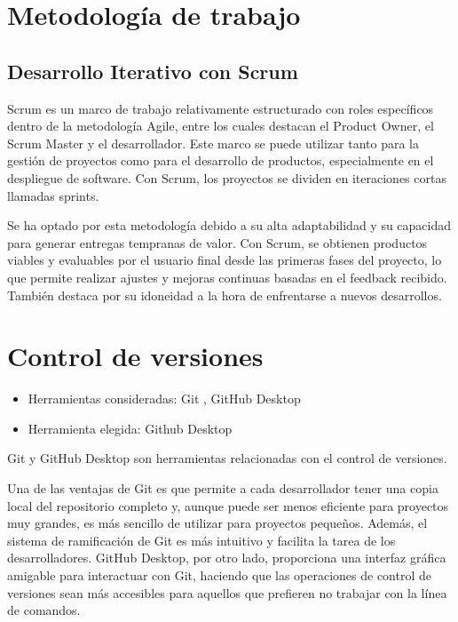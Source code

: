 
\section{Metodología de trabajo}\label{metodologias}

\subsection{Desarrollo Iterativo con Scrum}\label{scrum}
Scrum es un marco de trabajo relativamente estructurado con roles específicos dentro de la metodología Agile, entre los cuales destacan el Product Owner, el Scrum Master y el desarrollador. Este marco se puede utilizar tanto para la gestión de proyectos como para el desarrollo de productos, especialmente en el despliegue de software. Con Scrum, los proyectos se dividen en iteraciones cortas llamadas sprints.

Se ha optado por esta metodología debido a su alta adaptabilidad y su capacidad para generar entregas tempranas de valor. Con Scrum, se obtienen productos viables y evaluables por el usuario final desde las primeras fases del proyecto, lo que permite realizar ajustes y mejoras continuas basadas en el feedback recibido. También destaca por su idoneidad a la hora de enfrentarse a nuevos desarrollos. 


\section{Control de versiones}\label{control_versiones}
\begin{itemize}
\item  
Herramientas consideradas: Git \citep{online:git}, GitHub Desktop \citep{online:githubdesktop}
\item
  Herramienta elegida: Github Desktop
\end{itemize}
Git y GitHub Desktop son herramientas relacionadas con el control de versiones.

Una de las ventajas de Git es que permite a cada desarrollador tener una copia local del repositorio completo y, aunque puede ser menos eficiente para proyectos muy grandes, es más sencillo de utilizar para proyectos pequeños. Además, el sistema de ramificación de Git es más intuitivo y facilita la tarea de los desarrolladores. GitHub Desktop, por otro lado, proporciona una interfaz gráfica amigable para interactuar con Git, haciendo que las operaciones de control de versiones sean más accesibles para aquellos que prefieren no trabajar con la línea de comandos.

